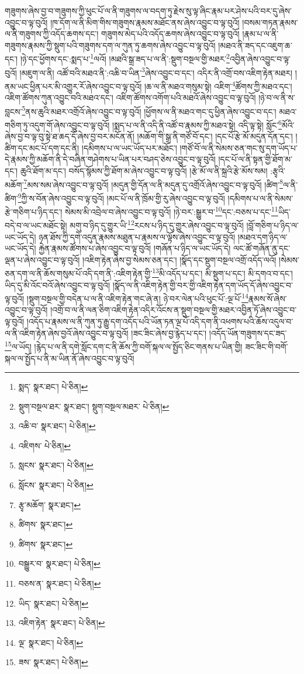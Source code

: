 གཟུགས་ཞེས་བྱ་བ་གཟུགས་ཀྱི་ཕུང་པོ་ལ་ནི་གཟུགས་ལ་བདག་ཏུ་རྗེས་སུ་ལྟ་ཞིང་རྣམ་པར་ཤེས་པའི་བར་དུ་ཞེས་འབྱུང་བ་ལྟ་བུའོ། །ཁ་དོག་ལ་ནི་མིག་གིས་གཟུགས་རྣམས་མཐོང་ནས་ཞེས་འབྱུང་བ་ལྟ་བུའོ། །བསམ་གཏན་རྣམས་ལ་ནི་གཟུགས་ཀྱི་འདོད་ཆགས་དང་། གཟུགས་མེད་པའི་འདོད་ཆགས་ཞེས་འབྱུང་བ་ལྟ་བུའོ། །རྣམ་པ་ལ་ནི་གཟུགས་རྣམས་ཀྱི་སྡུག་པའི་གཟུགས་དག་ལ་ཀུན་ཏུ་ཆགས་ཞེས་འབྱུང་བ་ལྟ་བུའོ། །མཐའ་ནི་ཟད་དང་འཇུག་ཆ་དང་། །ཉེ་དང་ཕྱོགས་དང་:སྨད་པ་\footnote{སྨད་  སྣར་ཐང་།  པེ་ཅིན། }ལའོ། །མཐའི་སྒྲ་ཟད་པ་ལ་ནི་:སྡུག་བསྔལ་གྱི་མཐར་\footnote{སྡུག་བསྔལ་ཐར་  སྣར་ཐང་། སྡུག་བསྔལ་མཐར་  པེ་ཅིན། }འབྱིན་ཞེས་འབྱུང་བ་ལྟ་བུའོ། །མཇུག་ལ་ནི། འཚོ་བའི་མཐའ་ནི་:འཆི་བ་ཡིན་\footnote{འཆི་བ་  སྣར་ཐང་།  པེ་ཅིན། }ཞེས་འབྱུང་བ་དང་། འདིར་ནི་འགྲོ་བས་འཇིག་རྟེན་མཐར། །ནམ་ཡང་ཕྱིན་པར་མི་འགྱུར་རོ་ཞེས་འབྱུང་བ་ལྟ་བུའོ། །ཆ་ལ་ནི་མཐའ་གསུམ་སྟེ། འཇིག་\footnote{འཇིགས་  པེ་ཅིན། }ཚོགས་ཀྱི་མཐའ་དང་། འཇིག་ཚོགས་ཀུན་འབྱུང་བའི་མཐའ་དང་། འཇིག་ཚོགས་འགོག་པའི་མཐའོ་ཞེས་འབྱུང་བ་ལྟ་བུའོ། །ཉེ་བ་ལ་ནི་ས་བླངས་\footnote{སླངས་  སྣར་ཐང་།  པེ་ཅིན། }ནས་ཆུའི་མཐར་འགྲོའོ་ཞེས་འབྱུང་བ་ལྟ་བུའོ། །ཕྱོགས་ལ་ནི་མཐའ་གང་དུ་ཕྱིན་ཞེས་འབྱུང་བ་དང་། མཐའ་གཅིག་ཏུ་འདུག་གོ་ཞེས་འབྱུང་བ་ལྟ་བུའོ། །སྨད་པ་ལ་ནི་འདི་ནི་འཚོ་བ་རྣམས་ཀྱི་མཐའ་སྟེ། འདི་ལྟ་སྟེ། སློང་\footnote{སློངས་  སྣར་ཐང་།  པེ་ཅིན། }མོའི་ཞེས་བྱ་བ་ལྟ་བུ་སྟེ་ཐ་ཆད་དོ་ཞེས་བྱ་བར་མངོན་ནོ། །མཆོག་གི་སྒྲ་ནི་གཙོ་བོ་དང་། །དང་པོ་རྩེ་མོ་མདུན་དོན་དང་། །ཚིག་དང་མང་པོ་དག་དང་ནི། །དམིགས་པ་ལ་ཡང་ཡོད་པར་མཐོང་། །གཙོ་བོ་ལ་ནི་སེམས་ཅན་གང་སུ་དག་ཡོད་པ་དེ་རྣམས་ཀྱི་མཆོག་ནི་དེ་བཞིན་གཤེགས་པ་ཡིན་པར་བཤད་ཅེས་འབྱུང་བ་ལྟ་བུའོ། །དང་པོ་ལ་ནི་སྟན་གྱི་ཐོག་མ་དང་། ཆུའི་ཐོག་མ་དང་། བསོད་སྙོམས་ཀྱི་ཐོག་མ་ཞེས་འབྱུང་བ་ལྟ་བུའོ། །རྩེ་མོ་ལ་ནི་སྐྲའི་རྩེ་མོས་སམ། :རྩྭའི་མཆོག་\footnote{རྩྭ་མཆོག་  སྣར་ཐང་། }མས་སམ་ཞེས་འབྱུང་བ་ལྟ་བུའོ། །མདུན་གྱི་དོན་ལ་ནི་མདུན་དུ་འགྲོའོ་ཞེས་འབྱུང་བ་ལྟ་བུའོ། །ཚིག་\footnote{ཚིགས་  སྣར་ཐང་། }ལ་ནི་ཚིག་\footnote{ཚིགས་  སྣར་ཐང་། }ཀྱི་ས་བོན་ཞེས་འབྱུང་བ་ལྟ་བུའོ། །མང་པོ་ལ་ནི་ཁྲོམ་གྱི་རུ་ཞེས་འབྱུང་བ་ལྟ་བུའོ། །དམིགས་པ་ལ་ནི་སེམས་རྩེ་གཅིག་པ་ཉིད་དང་། སེམས་མི་འབྲེལ་བ་ཞེས་འབྱུང་བ་ལྟ་བུའོ། །ཉེ་བར་:སྒྱུར་བ་\footnote{བསྒྱུར་བ་  སྣར་ཐང་།  པེ་ཅིན། }དང་:བཅས་པ་དང་\footnote{བཅས་ན་  སྣར་ཐང་།  པེ་ཅིན། }ཡིད་བདེ་བ་ལ་ཡང་མཐོང་སྟེ། མགུ་བ་ཉིད་དུ་གྱུར་ཡི་\footnote{ཡིད་  སྣར་ཐང་།  པེ་ཅིན། }རངས་པ་ཉིད་དུ་གྱུར་ཞེས་འབྱུང་བ་ལྟ་བུའོ། །བློ་གཅིག་པ་ཉིད་ལ་ཡང་ཡོད་དེ། ཉན་ཐོས་ཀྱི་དགེ་འདུན་རྣམས་མཐུན་པ་རྣམས་ལ་ལྟོས་ཞེས་འབྱུང་བ་ལྟ་བུའོ། །མཐའ་དག་ཉིད་ལ་ཡང་ཡོད་དེ། རྐྱེན་རྣམས་ཚོགས་པ་ཞེས་འབྱུང་བ་ལྟ་བུའོ། །གཞོན་པ་ཉིད་ལ་ཡང་ཡོད་དེ། ལང་ཚོ་གཞོན་ནུ་དང་ལྡན་པ་ཞེས་འབྱུང་བ་ལྟ་བུའོ། །འཇིག་རྟེན་ཞེས་བྱ་སེམས་ཅན་དང་། །སྣོད་དང་སྡུག་བསྔལ་འགྲོ་འདོད་ལའོ། །སེམས་ཅན་དག་ལ་ནི་ཆོས་གསུམ་པོ་འདི་དག་ནི་:འཇིག་རྟེན་གྱི་\footnote{འཇིག་རྟེན་  སྣར་ཐང་།  པེ་ཅིན། }མི་འདོད་པ་དང་། མི་སྡུག་པ་དང་། མི་དགའ་བ་དང་། ཡིད་དུ་མི་འོང་བའོ་ཞེས་འབྱུང་བ་ལྟ་བུའོ། །སྣོད་ལ་ནི་འཇིག་རྟེན་གྱི་བར་གྱི་འཇིག་རྟེན་དག་ཡོད་དོ་ཞེས་འབྱུང་བ་ལྟ་བུའོ། །སྡུག་བསྔལ་གྱི་བདེན་པ་ལ་ནི་འཇིག་རྟེན་གང་ཞེ་ན། ཉེ་བར་ལེན་པའི་ཕུང་པོ་:ལྔ་པོ་\footnote{ལྔ་  སྣར་ཐང་།  པེ་ཅིན། }རྣམས་སོ་ཞེས་འབྱུང་བ་ལྟ་བུའོ། །འགྲོ་བ་ལ་ནི་ལན་ཅིག་འཇིག་རྟེན་འདིར་འོངས་ན་སྡུག་བསྔལ་གྱི་མཐར་འབྱིན་ཏོ་ཞེས་འབྱུང་བ་ལྟ་བུའོ། །འདོད་པ་རྣམས་ལ་ནི་ཀུན་ཏུ་རྒྱུ་དག་འདོད་པའི་ཡོན་ཏན་ལྔ་པོ་འདི་དག་ནི་འཕགས་པའི་ཆོས་འདུལ་བ་ལ་ནི་འཇིག་རྟེན་ཞེས་བྱའོ་ཞེས་འབྱུང་བ་ལྟ་བུའོ། །ཟང་ཟིང་ཞེས་བྱ་རྙེད་པ་དང་། །འདོད་ཡོན་གཟུགས་དང་ཟད་\footnote{ཟས་  སྣར་ཐང་།  པེ་ཅིན། }ལ་ཡོད། །རྙེད་པ་ལ་ནི་དགེ་སློང་དག་ང་ནི་ཆོས་ཀྱི་བགོ་སྐལ་ལ་སྤྱོད་ཅིང་གནས་པ་ཡིན་གྱི། ཟང་ཟིང་གི་བགོ་སྐལ་ལ་སྤྱོད་པ་ནི་མ་ཡིན་ནོ་ཞེས་འབྱུང་བ་ལྟ་བུའོ། 